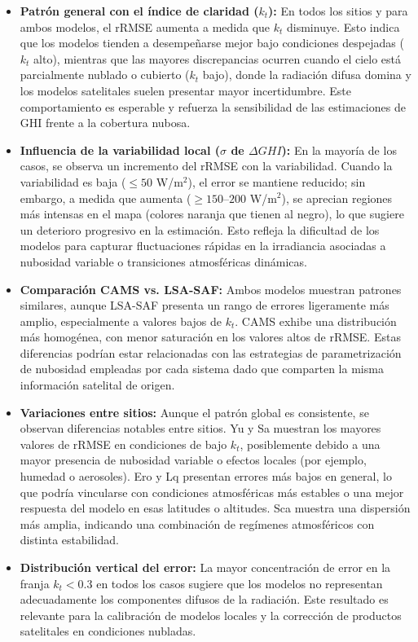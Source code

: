 \begin{itemize}
    \item \textbf{Patrón general con el índice de claridad ($k_t$):} En todos los sitios y para ambos modelos, el rRMSE aumenta a medida que $k_t$ disminuye. Esto indica que los modelos tienden a desempeñarse mejor bajo condiciones despejadas ($k_t$ alto), mientras que las mayores discrepancias ocurren cuando el cielo está parcialmente nublado o cubierto ($k_t$ bajo), donde la radiación difusa domina y los modelos satelitales suelen presentar mayor incertidumbre. Este comportamiento es esperable y refuerza la sensibilidad de las estimaciones de GHI frente a la cobertura nubosa.

    \item \textbf{Influencia de la variabilidad local ($\sigma$ de $\Delta GHI$):} En la mayoría de los casos, se observa un incremento del rRMSE con la variabilidad. Cuando la variabilidad es baja ($\leq 50$ W/m$^2$), el error se mantiene reducido; sin embargo, a medida que aumenta ($\geq 150$–$200$ W/m$^2$), se aprecian regiones más intensas en el mapa (colores naranja que tienen al negro), lo que sugiere un deterioro progresivo en la estimación. Esto refleja la dificultad de los modelos para capturar fluctuaciones rápidas en la irradiancia asociadas a nubosidad variable o transiciones atmosféricas dinámicas.

    \item \textbf{Comparación CAMS vs. LSA-SAF:} Ambos modelos muestran patrones similares, aunque LSA-SAF presenta un rango de errores ligeramente más amplio, especialmente a valores bajos de $k_t$. CAMS exhibe una distribución más homogénea, con menor saturación en los valores altos de rRMSE. Estas diferencias podrían estar relacionadas con las estrategias de parametrización de nubosidad empleadas por cada sistema dado que comparten la misma información satelital de origen.

    \item \textbf{Variaciones entre sitios:} Aunque el patrón global es consistente, se observan diferencias notables entre sitios. Yu y Sa muestran los mayores valores de rRMSE en condiciones de bajo $k_t$, posiblemente debido a una mayor presencia de nubosidad variable o efectos locales (por ejemplo, humedad o aerosoles). Ero y Lq presentan errores más bajos en general, lo que podría vincularse con condiciones atmosféricas más estables o una mejor respuesta del modelo en esas latitudes o altitudes. Sca muestra una dispersión más amplia, indicando una combinación de regímenes atmosféricos con distinta estabilidad.

    \item \textbf{Distribución vertical del error:} La mayor concentración de error en la franja $k_t < 0.3$ en todos los casos sugiere que los modelos no representan adecuadamente los componentes difusos de la radiación. Este resultado es relevante para la calibración de modelos locales y la corrección de productos satelitales en condiciones nubladas.
\end{itemize}



